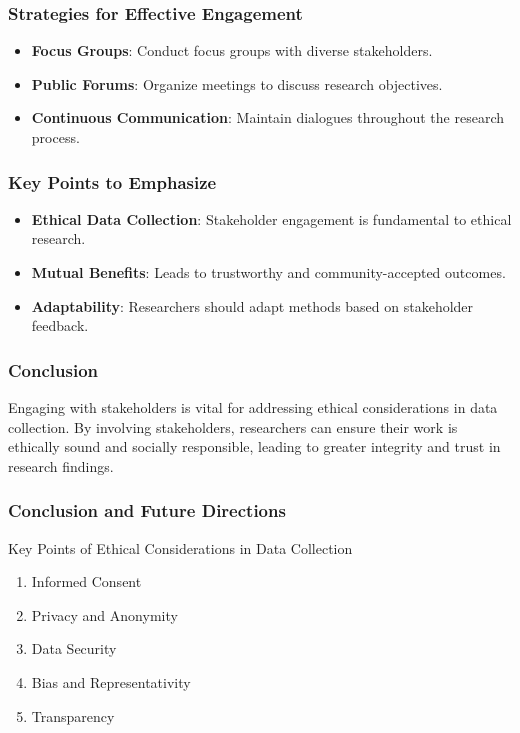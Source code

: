 \documentclass{beamer}
\begin{document}
\begin{frame}[fragile]
    \frametitle{Strategies for Effective Engagement}
    \begin{itemize}
        \item \textbf{Focus Groups}: Conduct focus groups with diverse stakeholders.
        \item \textbf{Public Forums}: Organize meetings to discuss research objectives.
        \item \textbf{Continuous Communication}: Maintain dialogues throughout the research process.
    \end{itemize}
\end{frame}

\begin{frame}[fragile]
    \frametitle{Key Points to Emphasize}
    \begin{itemize}
        \item \textbf{Ethical Data Collection}: Stakeholder engagement is fundamental to ethical research.
        \item \textbf{Mutual Benefits}: Leads to trustworthy and community-accepted outcomes.
        \item \textbf{Adaptability}: Researchers should adapt methods based on stakeholder feedback.
    \end{itemize}
\end{frame}

\begin{frame}[fragile]
    \frametitle{Conclusion}
    Engaging with stakeholders is vital for addressing ethical considerations in data collection. By involving stakeholders, researchers can ensure their work is ethically sound and socially responsible, leading to greater integrity and trust in research findings.
\end{frame}

\begin{frame}[fragile]
    \frametitle{Conclusion and Future Directions}

    \begin{block}{Key Points of Ethical Considerations in Data Collection}
        \begin{enumerate}
            \item Informed Consent
            \item Privacy and Anonymity
            \item Data Security
            \item Bias and Representativity
            \item Transparency
        \end{enumerate}
    \end{block}
\end{frame}
\end{document}
